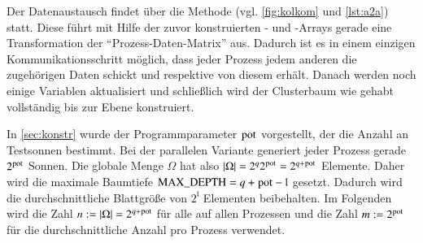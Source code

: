     Der Datenaustausch findet über die Methode  (vgl. \autoref{fig:kolkom} und \autoref{lst:a2a}) statt. Diese führt mit Hilfe der zuvor konstruierten - und 
    -Arrays gerade eine Transformation der ``Prozess-Daten-Matrix'' aus. Dadurch ist es in einem einzigen Kommunikationsschritt möglich, dass jeder Prozess jedem anderen die zugehörigen 
    Daten schickt und respektive von diesem erhält. Danach werden noch einige Variablen aktualisiert und schließlich wird der Clusterbaum wie gehabt vollständig bis zur Ebene  
    konstruiert. 
    
    In \autoref{sec:konstr} wurde der Programmparameter $\tcode{pot}$ vorgestellt, der die Anzahl an Testsonnen bestimmt. Bei der parallelen Variante generiert jeder Prozess gerade $2^{\tcode{pot}}$
    Sonnen. Die globale Menge $\Omega$ hat also $|\Omega| = 2^q 2^\tcode{pot} = 2^{q+\tcode{pot}}$ Elemente. Daher wird die maximale Baumtiefe $\tcode{MAX_DEPTH} = q + \tcode{pot} - \mathfrak{l}$ 
    gesetzt. Dadurch wird die durchschnittliche Blattgröße von $2^\mathfrak{l}$ Elementen beibehalten. Im Folgenden wird die Zahl $n := |\Omega| = 2^{q+\tcode{pot}}$ für alle  auf allen 
    Prozessen und die Zahl $m := 2^\tcode{pot}$ für die durchschnittliche Anzahl  pro Prozess verwendet.
    
    
    
